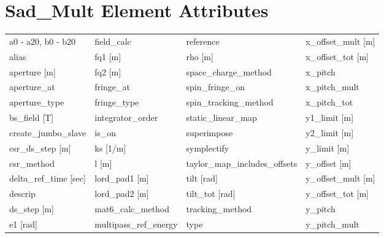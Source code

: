  \section{Sad_Mult Element Attributes}
 \label{s:list.sad.mult}
 
 \begin{tabular}{llll} \toprule
a0 - a20, b0 - b20               & field_calc                       & reference                        & x_offset_mult [m]                \\
alias                            & fq1 [m]                          & rho [m]                          & x_offset_tot [m]                 \\
aperture [m]                     & fq2 [m]                          & space_charge_method              & x_pitch                          \\
aperture_at                      & fringe_at                        & spin_fringe_on                   & x_pitch_mult                     \\
aperture_type                    & fringe_type                      & spin_tracking_method             & x_pitch_tot                      \\
bs_field [T]                     & integrator_order                 & static_linear_map                & y1_limit [m]                     \\
create_jumbo_slave               & is_on                            & superimpose                      & y2_limit [m]                     \\
csr_ds_step [m]                  & ks [1/m]                         & symplectify                      & y_limit [m]                      \\
csr_method                       & l [m]                            & taylor_map_includes_offsets      & y_offset [m]                     \\
delta_ref_time [sec]             & lord_pad1 [m]                    & tilt [rad]                       & y_offset_mult [m]                \\
descrip                          & lord_pad2 [m]                    & tilt_tot [rad]                   & y_offset_tot [m]                 \\
ds_step [m]                      & mat6_calc_method                 & tracking_method                  & y_pitch                          \\
e1 [rad]                         & multipass_ref_energy             & type                             & y_pitch_mult                     \\

\end{tabular}

